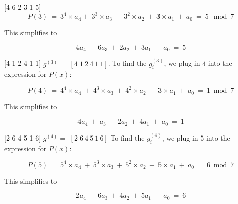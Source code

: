 \documentclass[11pt,preview]{standalone} %
\begin{document}
\begin{enumerate}
\begin{enumerate}
\begin{Freeform}{[4 6 2 3 1 5]}
     $$P(3)\ =\ 3^4 \times a_4 +\ 3^3 \times a_3\ +\ 3^2 \times a_2\ +\ 3 \times a_1\ +\ a_0\ =\ 5\ \bmod 7$$

     This simplifies to 

     $$4 a_4\ +\ 6 a_3\ +\ 2 a_2\ +\ 3 a_1\ +\ a_0\ =\ 5$$

     \end{Freeform}
     \begin{Freeform}{[4 1 2 4 1 1]}
     $ g^{(3)} = $
     \Solution $[4\ 1\ 2\ 4\ 1\ 1]$. To find the $g_i^{(3)}$, we plug in $4$ into the expression for $P(x)$:

     $$P(4)\ =\ 4^4 \times a_4\ +\ 4^3 \times a_3\ +\ 4^2 \times a_2\ +\ 3 \times a_1\ +\ a_0\ =\ 1 \bmod 7$$

     This simplifies to 

     $$4 a_4\ +\ a_3\ +\ 2 a_2\ +\ 4 a_1\ +\ a_0\ =\ 1$$
     \end{Freeform}
     \begin{Freeform}{[2 6 4 5 1 6]}
     $ g^{(4)} = $
     \Solution $[2\ 6\ 4\ 5\ 1\ 6]$ To find the $g_i^{(4)}$, we plug in $5$ into the expression for $P(x)$:

     $$P(5)\ =\ 5^4 \times a_4\ +\ 5^3 \times a_3\ +\ 5^2 \times a_2\ +\ 5 \times a_1\ +\ a_0\ =\ 6 \bmod 7$$

     This simplifies to 

     $$2 a_4\ +\ 6 a_3\ +\ 4 a_2\ +\ 5 a_1\ +\ a_0\ =\ 6$$     


\end{Freeform}
\end{enumerate}
\end{enumerate}
\end{document}

